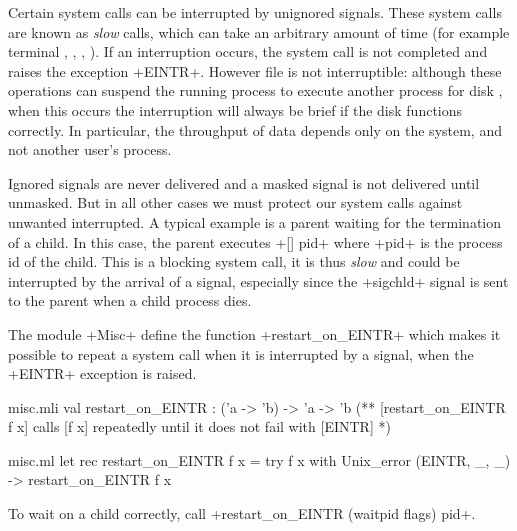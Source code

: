 Certain system calls can be interrupted by unignored signals. These
system calls are known as \emph{slow} calls, which can take an
arbitrary amount of time (for example terminal \io,
, , \etc).  If
an interruption occurs, the system call is not completed and raises
the exception \ml+EINTR+.  However file \io{} is not interruptible:
although these operations can suspend the running process to execute
another process for disk \io{}, when this occurs the interruption will
always be brief if the disk functions correctly.  In particular, the
throughput of data depends only on the system, and not another user's
process.

Ignored signals are never delivered and a masked signal is not
delivered until unmasked. But in all other cases we must protect our
system calls against unwanted interrupted. A typical example is a
parent waiting for the termination of a child.  In this case, the
parent executes  \ml+[] pid+ where \ml+pid+ is the
process id of the child.  This is a blocking system call, it is thus
\emph{slow} and could be interrupted by the arrival of a signal,
especially since the \ml+sigchld+ signal is sent to the parent when a
child process dies.

The module \ml+Misc+ define the function \ml+restart_on_EINTR+ which
makes it possible to repeat a system call when it is interrupted by a
signal, \ie{} when the \ml+EINTR+ exception is raised.
%
\begin{codefile}{misc.mli}
val restart_on_EINTR : ('a -> 'b) -> 'a -> 'b
(** [restart_on_EINTR f x] calls [f x] repeatedly until it does not fail
with [EINTR] *)
\end{codefile}
%
\begin{listingcodefile}{misc.ml}
let rec restart_on_EINTR f x = 
  try f x with Unix_error (EINTR, _, _) -> restart_on_EINTR f x
\end{listingcodefile}
To wait on a child correctly, call
\ml+restart_on_EINTR (waitpid flags) pid+.

